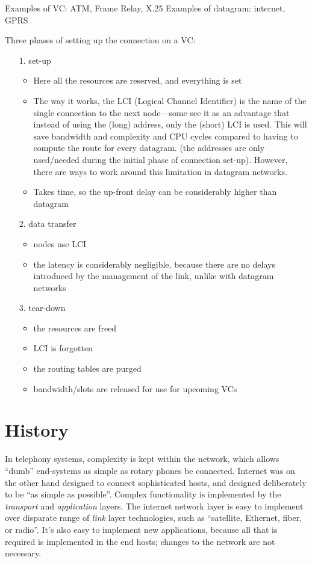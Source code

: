 \documentclass[10pt]{report}
\begin{document}
Examples of VC: ATM, Frame Relay, X.25
Examples of datagram: internet, GPRS


Three phases of setting up the connection on a VC:

\begin{itemize}
\item[1.] set-up
    \begin{itemize}
    \item Here all the resources are reserved, and everything is set
    \item The way it works, the LCI (Logical Channel Identifier) is the name of the single connection to the next node---some see it as an advantage that instead of using the (long) address, only the (short) LCI is used.  This will save bandwidth and complexity and CPU cycles compared to having to compute the route for every datagram. \cite[p 158]{russell} (the addresses are only used/needed during the initial phase of connection set-up).  However, there are ways to work around this limitation in datagram networks.
    \item Takes time, so the up-front delay can be considerably higher than datagram
    \end{itemize}
\item[2.] data transfer
    \begin{itemize}
    \item nodes use LCI
    \item the latency is considerably negligible, because there are no delays introduced by the management of the link, unlike with datagram networks
    \end{itemize}
\item[3.] tear-down
    \begin{itemize}
        \item the resources are freed
	\item LCI is forgotten
	\item the routing tables are purged
	\item bandwidth/slots are released for use for upcoming VCs
    \end{itemize}
\end{itemize}


\section{History}

In telephony systems, complexity is kept within the network, which allows
``dumb'' end-systems as simple as rotary phones be connected.  Internet was on
the other hand designed to connect sophisticated hosts, and designed
deliberately to be ``as simple as possible''.  Complex functionality is
implemented by the {\em transport} and {\em application} layers.  The internet
network layer is easy to implement over disparate range of {\em link} layer
technologies, such as ``satellite, Ethernet, fiber, or radio''.  It's also easy
to implement new applications, because all that is required is implemented in
the end hosts; changes to the network are not necessary.
\cite[pp349--351]{kurose}
\end{document}
